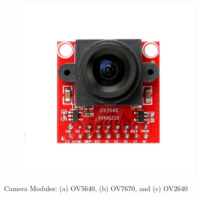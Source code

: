 \begin{figure}[h!]
\begin{subfigure}[b]{0.3\textwidth}
		\caption{}
		\label{fig:ov7670}
	\end{subfigure}
	\hfill
	\begin{subfigure}[b]{0.3\textwidth}
		\centering
		\includegraphics[width=\linewidth]{assets/ch2/OV2640}
		\caption{}
		\label{fig:ov2640}
	\end{subfigure}
	\caption{Camera Modules: (a) OV5640, (b) OV7670, and (c) OV2640}
	\label{fig:camera_modules}
\end{figure}


